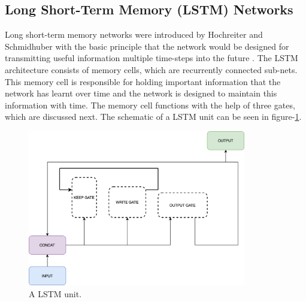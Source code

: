 \subsection{Long Short-Term Memory (LSTM) Networks}
Long short-term memory networks were introduced by Hochreiter and Schmidhuber with the basic principle that the network would be designed for transmitting useful information multiple time-steps into the future  \cite{hochreiter1997long}. The LSTM architecture consists of memory cells, which are recurrently connected sub-nets. This memory cell is responsible for holding important information that the network has learnt over time and the network is designed to maintain this information with time. The memory cell functions with the help of three gates, which are discussed next. The schematic of a LSTM unit  can be seen in figure-\ref{fig:lstm-cell}.
\begin{figure}[!h]
	\centering
	\includegraphics[width=0.85\textwidth]{Pictures/lstm-cell.png}
	\hspace{1mm}
	\caption{A LSTM unit.} 
	\label{fig:lstm-cell}
\end{figure}

